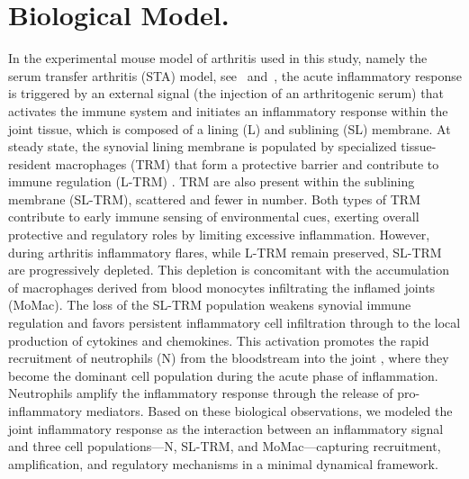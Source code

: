 \documentclass[a4paper, 12pt]{article}
\begin{document}
\section{Biological Model.}\label{sec:model}
In the experimental mouse model of arthritis used in this study, namely the serum transfer arthritis (STA) model, see~\cite{STA} and~\cite{weihaupt26},
 the acute inflammatory response is triggered by an external signal (the injection of an arthritogenic serum) 
 that activates the immune system and initiates an inflammatory response 
 within the joint tissue, which is composed of a lining (L) and sublining (SL) membrane.
  At steady state, the synovial lining membrane is populated by specialized tissue-resident macrophages (TRM) 
  that form a protective barrier and contribute to immune regulation (L-TRM) \cite{culemann2019}. TRM are also present within the sublining membrane (SL-TRM),
   scattered and fewer in number. 
  Both types of TRM contribute to early immune sensing of environmental cues, exerting overall protective and regulatory roles by limiting excessive inflammation.
   However, during arthritis inflammatory flares, while L-TRM remain preserved, SL-TRM are progressively depleted. 
   This depletion is concomitant with the accumulation of macrophages derived from blood monocytes infiltrating the inflamed joints (MoMac). 
   The loss of the SL-TRM population weakens synovial immune regulation and favors persistent inflammatory cell infiltration through 
   to the local production of cytokines and chemokines. This activation promotes the rapid recruitment of neutrophils (N) from the bloodstream into the joint \cite{culemann2019}, 
   where they become the dominant cell population during the acute phase of inflammation.
    Neutrophils amplify the inflammatory response through the release of pro-inflammatory mediators. 
     Based on these biological observations, we modeled the joint inflammatory response as the interaction between an inflammatory signal and three cell populations—N, SL-TRM, and MoMac—capturing recruitment,
      amplification, and regulatory mechanisms in a minimal dynamical framework.




\end{document}
